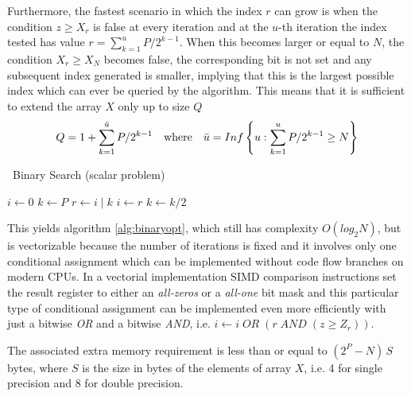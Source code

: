 \documentclass[preprint,1p,times]{elsarticle}
\begin{document}
Furthermore, the fastest scenario in which the index $r$ can grow is when the condition $z \geq X_{r}$ is false at every iteration and at the $u$-th iteration the index tested has value $r=\sum_{k=1}^u P/2^{k-1}$. When this becomes larger or equal to $N$, the condition $X_r \geq X_N$ becomes false, the corresponding bit is not set and any subsequent index generated is smaller, implying that this is the largest possible index which can ever be queried by the algorithm. 
This means that it is sufficient to extend the array $X$ only up to size $Q$
$$Q=1+\sum_{k=1}^{\bar{u}} P/2^{k-1}\quad\text{where}\quad\bar{u}=Inf \left \{ u: \sum_{k=1}^u P/2^{k-1} \geq N \right \}$$

\begin{algorithm}[ht]
	\caption{\BitSetName\  Binary Search (scalar problem)}
	\label{alg:binaryopt}
	\begin{algorithmic}
		 
		\State $i \leftarrow 0$
		\State $k \leftarrow P$
		\Repeat
		\State $r \leftarrow i\;|\;k$ 
		\State $i \leftarrow r$    
		\EndIf
		\State $k \leftarrow k / 2$ 
		\EndFunction
	\end{algorithmic}
\end{algorithm}

This yields algorithm \ref{alg:binaryopt}, which still has complexity $O(log_2N)$, but is vectorizable because the number of iterations is fixed and it involves only one conditional assignment which can be implemented without code flow branches on modern CPUs. In a vectorial implementation SIMD comparison instructions set the result register to either an \textit{all-zeros} or a \textit{all-one} bit mask and this particular type of conditional assignment can be implemented even more efficiently with just a bitwise \textit{OR} and a bitwise \textit{AND}, i.e. $i \leftarrow i \; OR \; (r \; AND \; (z \geq Z_r))$.

The associated extra memory requirement is less than or equal to $(2^P-N)\,S$ bytes, where $S$ is the size in bytes of the elements of array $X$, i.e. 4 for single precision and 8 for double precision.

\end{document}
